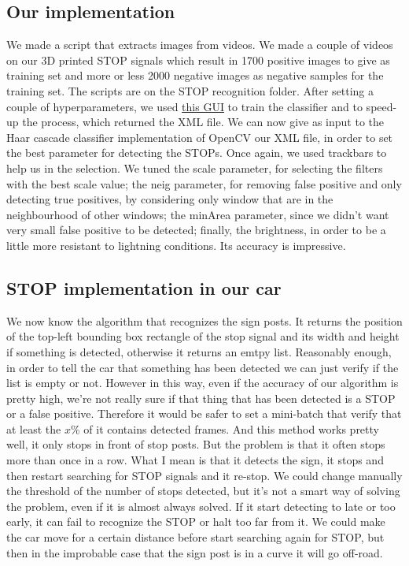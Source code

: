 \documentclass[12pt,a4paper]{article}
\begin{document}
\begin{large}
\subsection{Our implementation}
We made a script that extracts images from videos. We made a couple of videos on our 3D printed STOP signals which result in 1700 positive images to give as training set and more or less 2000 negative images as negative samples for the training set. The scripts are on the STOP recognition folder. After setting a couple of hyperparameters, we used \href{https://amin-ahmadi.com/cascade-trainer-gui/}{this GUI} to train the classifier and to speed-up the process, which returned the XML file.
We can now give as input to the Haar cascade classifier implementation of OpenCV our XML file, in order to set the best parameter for detecting the STOPs. Once again, we used trackbars to help us in the selection. We tuned the scale parameter, for selecting the filters with the best scale value; the neig parameter, for removing false positive and only detecting true positives, by considering only window that are in the neighbourhood of other windows; the minArea parameter, since we didn't want very small false positive to be detected; finally, the brightness, in order to be a little more resistant to lightning conditions. Its accuracy is impressive.



\subsection{STOP implementation in our car}
We now know the algorithm that recognizes the sign posts. It returns the position of the top-left bounding box rectangle of the stop signal and its width and height if something is detected, otherwise it returns an emtpy list. Reasonably enough, in order to tell the car that something has been detected we can just verify if the list is empty or not. However in this way, even if the accuracy of our algorithm is pretty high, we're not really sure if that thing that has been detected is a STOP or a false positive. Therefore it would be safer to set a mini-batch that verify that at least the $x$\% of it contains detected frames. And this method works pretty well, it only stops in front of stop posts. But the problem is that it often stops more than once in a row. What I mean is that it detects the sign, it stops and then restart searching for STOP signals and it re-stop. We could change manually the threshold of the number of stops detected, but it's not a smart way of solving the problem, even if it is almost always solved. If it start detecting to late or too early, it can fail to recognize the STOP or halt too far from it. We could make the car move for a certain distance before start searching again for STOP, but then in the improbable case that the sign post is in a curve it will go off-road.

\end{large}
\end{document}

